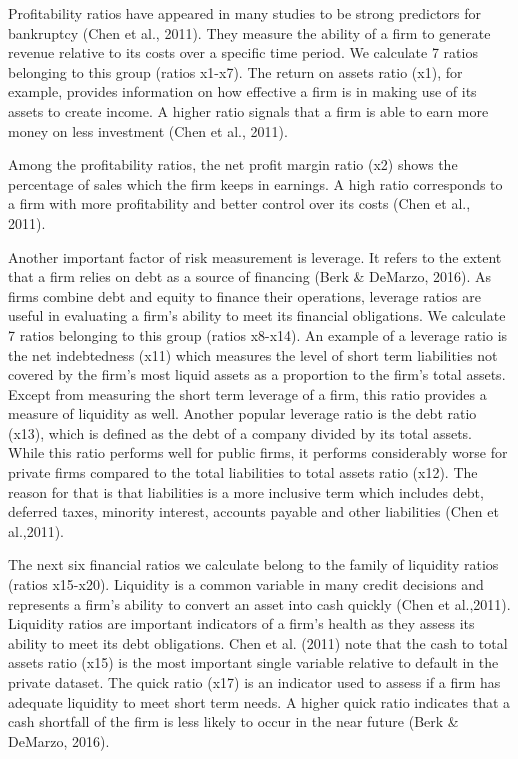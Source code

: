 \documentclass{article}
\begin{document}
\newpage


Profitability ratios have appeared in many studies to be strong predictors for bankruptcy (Chen et al., 2011). They measure the ability of a firm to generate revenue relative to its costs over a specific time period. We calculate 7 ratios belonging to this group (ratios x1-x7). The return on assets ratio (x1), for example, provides information on how effective a firm is in making use of its assets to create income. A higher ratio signals that a firm is able to earn more money on less investment (Chen et al., 2011). 

Among the profitability ratios, the net profit margin ratio (x2) shows the percentage of sales which the firm keeps in earnings. A high ratio corresponds to a firm with more profitability and better control over its costs (Chen et al., 2011).  

Another important factor of risk measurement is leverage. It refers to the extent that a firm relies on debt as a source of financing (Berk \& DeMarzo, 2016). As firms combine debt and equity to finance their operations, leverage ratios are useful in evaluating a firm's ability to meet its financial obligations. We calculate 7 ratios belonging to this group (ratios x8-x14). An example of a leverage ratio is the net indebtedness (x11) which measures the level of short term liabilities not covered by the firm's most liquid assets as a proportion to the firm's total assets. Except from measuring the short term leverage of a firm, this ratio provides a measure of liquidity as well. Another popular leverage ratio is the debt ratio (x13), which is defined as the debt of a company divided by its total assets. While this ratio performs well for public firms, it performs  considerably worse for private firms compared to the total liabilities to total assets ratio (x12). The reason for that is that liabilities is a more inclusive term which includes debt, deferred taxes, minority interest, accounts payable and other liabilities (Chen et al.,2011).
 
 The next six financial ratios we calculate belong to the family of liquidity ratios (ratios x15-x20). Liquidity is a common variable in many credit decisions and represents a firm's ability to convert an asset into cash quickly (Chen et al.,2011). Liquidity ratios are important indicators of a firm's health as they assess its ability to meet its debt obligations. Chen et al. (2011) note that the cash to total assets ratio (x15) is the most important single variable relative to default in the private dataset. The quick ratio (x17) is an indicator used to assess if a firm has adequate liquidity to meet short term needs. A higher quick ratio indicates that a cash shortfall of the firm is less likely to occur in the near future (Berk \& DeMarzo, 2016). 
 
\end{document}
